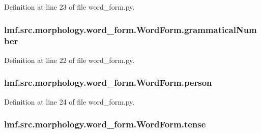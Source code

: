 Definition at line 23 of file word\+\_\+form.\+py.

\hypertarget{classlmf_1_1src_1_1morphology_1_1word__form_1_1_word_form_afa022505f197952b8cf9229e065089c2}{
\subsubsection[{grammatical\+Number}]{\setlength{\rightskip}{0pt plus 5cm}lmf.\+src.\+morphology.\+word\+\_\+form.\+Word\+Form.\+grammatical\+Number}}\label{classlmf_1_1src_1_1morphology_1_1word__form_1_1_word_form_afa022505f197952b8cf9229e065089c2}


Definition at line 22 of file word\+\_\+form.\+py.

\hypertarget{classlmf_1_1src_1_1morphology_1_1word__form_1_1_word_form_a982fc33af45a08aa5a039dc4701c3689}{
\subsubsection[{person}]{\setlength{\rightskip}{0pt plus 5cm}lmf.\+src.\+morphology.\+word\+\_\+form.\+Word\+Form.\+person}}\label{classlmf_1_1src_1_1morphology_1_1word__form_1_1_word_form_a982fc33af45a08aa5a039dc4701c3689}


Definition at line 24 of file word\+\_\+form.\+py.

\hypertarget{classlmf_1_1src_1_1morphology_1_1word__form_1_1_word_form_aaf6dd6658e2e9014ea0490d0edb6cec8}{
\subsubsection[{tense}]{\setlength{\rightskip}{0pt plus 5cm}lmf.\+src.\+morphology.\+word\+\_\+form.\+Word\+Form.\+tense}}\label{classlmf_1_1src_1_1morphology_1_1word__form_1_1_word_form_aaf6dd6658e2e9014ea0490d0edb6cec8}


